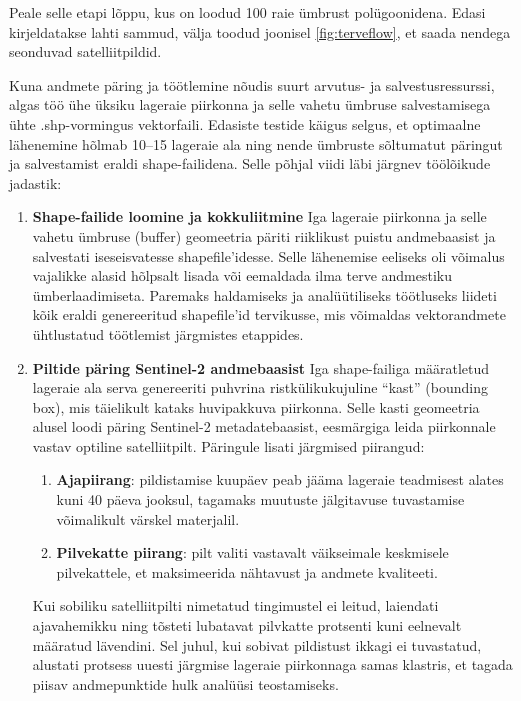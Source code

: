 Peale selle etapi lõppu, kus on loodud 100 raie ümbrust polügoonidena. Edasi kirjeldatakse lahti sammud, välja toodud joonisel \ref{fig:terveflow}, et saada nendega seonduvad satelliitpildid.

Kuna andmete päring ja töötlemine nõudis suurt arvutus- ja salvestusressurssi,
algas töö ühe üksiku lageraie piirkonna ja selle vahetu ümbruse salvestamisega
ühte .shp-vormingus vektorfaili. Edasiste testide käigus selgus, et optimaalne
lähenemine hõlmab 10--15 lageraie ala ning nende ümbruste sõltumatut päringut ja
salvestamist eraldi shape-failidena. Selle põhjal viidi läbi järgnev töölõikude
jadastik:
\begin{enumerate}[topsep=1pt,itemsep=1ex,partopsep=1ex,parsep=1ex]

\item \textbf{Shape-failide loomine ja kokkuliitmine}\newline
Iga lageraie piirkonna ja selle vahetu
ümbruse (buffer) geomeetria päriti riiklikust puistu andmebaasist ja salvestati
iseseisvatesse shapefile'idesse. Selle lähenemise eeliseks oli võimalus
vajalikke alasid hõlpsalt lisada või eemaldada ilma terve andmestiku
ümberlaadimiseta. Paremaks haldamiseks ja analüütiliseks töötluseks liideti kõik
eraldi genereeritud shapefile'id  tervikusse, mis võimaldas
vektorandmete ühtlustatud töötlemist järgmistes etappides.

\item \textbf{Piltide päring Sentinel-2 andmebaasist} \newline
Iga shape-failiga määratletud lageraie
ala serva genereeriti puhvrina ristkülikukujuline ``kast'' (bounding box), mis
täielikult kataks huvipakkuva piirkonna. Selle kasti geomeetria alusel loodi
päring Sentinel-2 metadatebaasist, eesmärgiga leida piirkonnale vastav optiline
satelliitpilt. Päringule lisati järgmised piirangud:

\begin{enumerate}

\item \textbf{Ajapiirang}: pildistamise kuupäev peab jääma lageraie teadmisest alates kuni 40
päeva jooksul, tagamaks muutuste jälgitavuse tuvastamise võimalikult värskel
materjalil.

\item \textbf{Pilvekatte piirang}: pilt valiti vastavalt väikseimale keskmisele pilvekattele,
et maksimeerida nähtavust ja andmete kvaliteeti.
\end{enumerate}

Kui sobiliku satelliitpilti nimetatud tingimustel ei leitud,
laiendati ajavahemikku ning tõsteti lubatavat pilvkatte protsenti kuni eelnevalt
määratud lävendini. Sel juhul, kui sobivat pildistust ikkagi ei tuvastatud,
alustati protsess uuesti järgmise lageraie piirkonnaga samas klastris, et tagada
piisav andmepunktide hulk analüüsi teostamiseks.


\end{enumerate}
